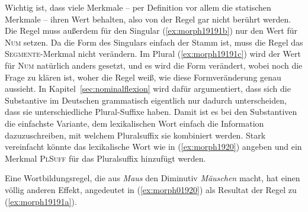 \begin{exe}
  \ex\label{ex:morph19191}
  \begin{xlist}
  \end{xlist}
\end{exe}

Wichtig ist, dass viele Merkmale -- per Definition vor allem die statischen Merkmale -- ihren Wert behalten, also von der Regel gar nicht berührt werden.
Die Regel muss außerdem für den Singular (\ref{ex:morph19191b}) nur den Wert für \textsc{Num} setzen.
Da die Form des Singulars einfach der Stamm ist, muss die Regel das \textsc{Segmente}-Merkmal nicht verändern.
Im Plural (\ref{ex:morph19191c}) wird der Wert für \textsc{Num} natürlich anders gesetzt, und es wird die Form verändert, wobei noch die Frage zu klären ist, woher die Regel weiß, wie diese Formveränderung genau aussieht.
In Kapitel~\ref{sec:nominalflexion} wird dafür argumentiert, dass sich die Substantive im Deutschen grammatisch eigentlich nur dadurch unterscheiden, dass sie unterschiedliche Plural-Suffixe haben.
Damit ist es bei den Substantiven die einfachste Variante, dem lexikalischen Wort einfach die Information dazuzuschreiben, mit welchem Pluralsuffix sie kombiniert werden.
Stark vereinfacht könnte das lexikalische Wort wie in (\ref{ex:morph1920}) angeben und ein Merkmal \textsc{PlSuff} für das Pluralsuffix hinzufügt werden.

\begin{exe}
\end{exe}

Eine Wortbildungsregel, die \zB aus \textit{Maus} den Diminutiv \textit{Mäuschen} macht, hat einen völlig anderen Effekt, angedeutet in (\ref{ex:morph01920}) als Resultat der Regel zu (\ref{ex:morph19191a}).


